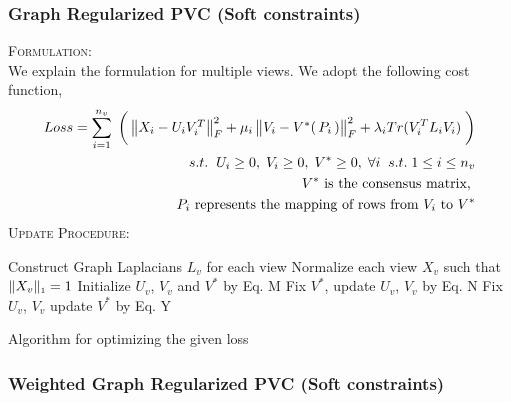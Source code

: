 \documentclass[a4paper]{article}
\begin{document}
	\subsubsection{Graph Regularized PVC (Soft constraints)}
	
	\textsc{Formulation:}\\
	We explain the formulation for multiple views. We adopt the following cost function,
	\begin{align*}	
	Loss = \displaystyle\sum_{i=1}^{n_{v}} \; \bigg(\begin{Vmatrix} X_{i}-U_{i}V^{T}_{i} \end{Vmatrix}^{2}_{F}	
		+ \mu_{i}\begin{Vmatrix} V_{i}-V^{*}(\, P_{i} \, ) \end{Vmatrix}^{2}_{F}
		+ \lambda_{i}Tr(V^{T}_{i}L_{i}V_{i}) \; \bigg)\\	
		s.t. \hspace{2mm}  U_{i}\geq0,\;V_{i}\geq0,\;V^{*}\geq0,\;\forall i \;\;s.t.\; 1 \leq i \leq n_{v}\\
		V^{*} \text{ is the consensus matrix, } \\
		P_{i} \text{ represents the mapping of rows from } V_{i} \text{ to } V^{*}\\
	\end{align*}	
	\noindent
	\textsc{Update Procedure:}
	
	\begin{algorithm}
		Construct Graph Laplacians $L_{v}$ for each view\;
		Normalize each view $X_{v}$ such that $\|X_{v}\|_{\text{\tiny1}} = 1 $\;
		Initialize  $U_{v}$, $V_{v}$ and $V^{*}$ by Eq. M\;
		{
			{
				{
					Fix $V^{*}$, update $U_{v}$, $V_{v}$ by Eq. N\;
				}
			}
			Fix $U_{v}$, $V_{v}$ update $V^{*}$ by Eq. Y\;		
		}						
		\caption{Algorithm for optimizing the given loss}
	\end{algorithm}


	\subsubsection{Weighted Graph Regularized PVC (Soft constraints)}
	
\end{document}
